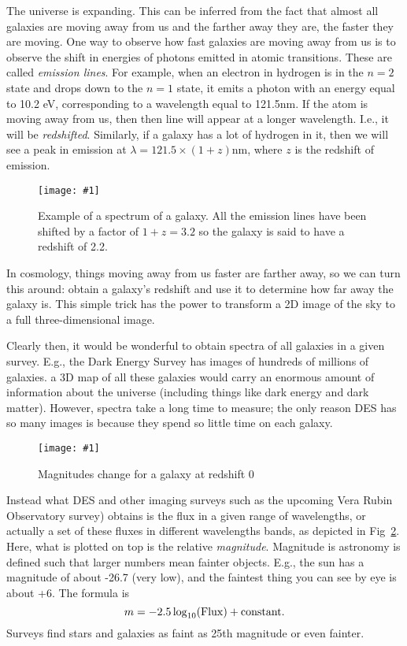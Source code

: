 \documentclass[prd,amsmath,aps,floats,amssymb, floatfix,
  superscriptaddress,nofootinbib]{revtex4-1}
\newcommand{\sfig}[2]{
\texttt{[image: \#1]}
        }
\newcommand{\Spng}[2]{
    \begin{figure}[thbp]
    \sfig{Figures/#1.png}{0.65\columnwidth}
    \caption{{\small #2}}
    \label{fig:#1}
    \end{figure}
}
\newcommand{\rf}[1]{\ref{fig:#1}}
\numberwithin{equation}{section}
\newcommand\be{\begin{equation}}
\newcommand\ee{\end{equation}}
\begin{document}
The universe is expanding. This can be inferred from the fact that almost all galaxies are moving away from us and the farther away they are, the faster they are moving. One way to observe how fast galaxies are moving away from us is to observe the shift in energies of photons emitted in atomic transitions. These are called {\it emission lines}. For example, when an electron in hydrogen is in the $n=2$ state and drops down to the $n=1$ state, it emits a photon with an energy equal to 10.2 eV, corresponding to a wavelength equal to 121.5nm. If the atom is moving away from us, then then line will appear at a longer wavelength. I.e., it will be {\it redshifted}. Similarly, if a galaxy has a lot of hydrogen in it, then we will see a peak in emission at $\lambda=121.5\times(1+z)$nm, where $z$ is the redshift of emission.

\Spng{redshift}{Example of a spectrum of a galaxy. All the emission lines have been shifted by a factor of $1+z=3.2$ so the galaxy is said to have a redshift of 2.2.}

In cosmology, things moving away from us faster are farther away, so we can turn this around: obtain a galaxy's redshift and use it to determine how far away the galaxy is. This simple trick has the power to transform a 2D image of the sky to a full three-dimensional image. 

Clearly then, it would be wonderful to obtain spectra of all galaxies in a given survey. E.g., the Dark Energy Survey has images of hundreds of millions of galaxies. a 3D map of all these galaxies would carry an enormous amount of information about the universe (including things like dark energy and dark matter). However, spectra take a long time to measure; the only reason DES has so many images is because they spend so little time on each galaxy. 

\Spng{photoz0}{Magnitudes change for a galaxy at redshift 0}

Instead what DES and other imaging surveys such as the upcoming Vera Rubin Observatory survey) obtains is the flux in a given range of wavelengths, or actually a set of these fluxes in  different wavelengths bands, as depicted in Fig~\rf{photoz0}. Here, what is plotted on top is the relative {\it magnitude}. Magnitude is astronomy is defined such that larger numbers mean fainter objects. E.g., the sun has a magnitude of about -26.7 (very low), and the faintest thing you can see by eye is about +6.
The formula is
\be
m = -2.5\log_{10}({\rm Flux}) + {\rm constant}
.\ee
Surveys find stars and galaxies as faint as 25th magnitude or even fainter. 
\end{document}
